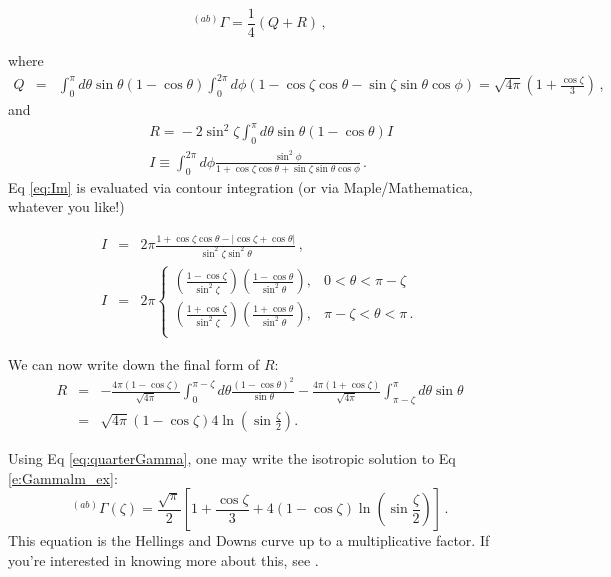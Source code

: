 \documentclass[article, onecolumn, ,nofootinbib,nopreprintnumbers]{revtex4}
\newcommand{\bea}{\begin{eqnarray}}
\newcommand{\eea}{\end{eqnarray}}
\begin{document}
\begin{enumerate}
\begin{equation}
^{(ab)}\Gamma=\frac{1}{4}(Q+R)\label{eq:quarterGamma}\, , 
\end{equation}

where
\begin{eqnarray}
Q &=&  \int_0^\pi \!\!d\theta\sin\theta(1\!-\!\cos\theta) \int_0^{2\pi}d\phi (1\!-\!\cos\zeta\!\cos\theta\!-\!\sin\zeta\!\sin\theta\cos\phi) =\sqrt{4\pi}\left(1+\frac{\cos\zeta}{3}\right) \, ,
\label{eq:AppQ}
\end{eqnarray}
and
\begin{eqnarray}
	&&R\!=\!\!-2\sin^2\zeta\!\!\int_0^{\pi}\!\!\!d\theta\sin\theta(1\!-\!\cos\theta)I \label{eq:appendixRLM}  \\
	&&I\equiv\!\!\int_0^{2\pi}\!\!\!d\phi\frac{\sin^2\phi}{1+\cos\zeta\!\cos\theta+\sin\zeta\!\sin\theta\cos\phi}\, .
	\label{eq:Im}
\end{eqnarray}
Eq \eqref{eq:Im} is evaluated via contour integration (or via Maple/Mathematica, whatever you like!)

\begin{eqnarray}
I&=&2\pi\frac{1+\cos\zeta\cos\theta-|\cos\zeta+\cos\theta|}{\sin^2\zeta\sin^2\theta}\label{eq:An1}\, ,\\
I&=&2\pi
 \left\{
\begin{array}{lc}
\left(\frac{1-\cos\zeta}{\sin^2\zeta}\right)\left(\frac{1-\cos\theta}{\sin^2\theta}\right), &		 	0<\theta<\pi-\zeta 	\\
\left(\frac{1+\cos\zeta}{\sin^2\zeta}\right)\left(\frac{1+\cos\theta}{\sin^2\theta}\right), &	 \pi-\zeta<\theta<\pi \label{eq:R00pm}\, .\\
\end{array}
\right.
\end{eqnarray}

We can now write down the final form of $R$:
\bea
R&=&-\frac{4\pi(1-\cos\zeta)}{\sqrt{4\pi}}\!\int_0^{\pi-\zeta}\!\!\! d\theta  \frac{(1-\cos\theta)^2}{\sin\theta}-\frac{4\pi(1+\cos\zeta)}{\sqrt{4\pi}}\!\int_{\pi-\zeta}^\pi\!\!\! d\theta\sin\theta\\
&=&\sqrt{4\pi}(1-\cos\zeta)4\ln\left(\sin\frac{\zeta}{2}\right).
\eea

 Using Eq \eqref{eq:quarterGamma}, one may write the isotropic solution to Eq \eqref{e:Gammalm_ex}:
\begin{equation}
{}^{(ab)}\Gamma(\zeta)=\frac{\sqrt{\pi}}{2}\left[1+\frac{\cos\zeta}{3}+4(1-\cos\zeta)\ln\left(\sin\frac{\zeta}{2}\right)\right]\, .
\end{equation}
This equation is the Hellings and Downs curve up to a multiplicative factor. If you're interested in knowing more about this, see \cite{MingarelliSidery:2014}.


\end{enumerate}
\end{document}
